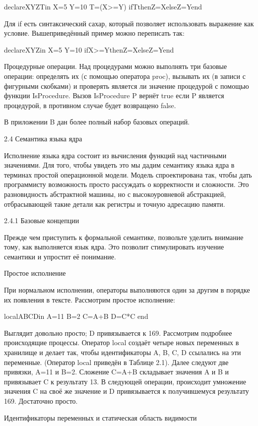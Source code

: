 declareXYZTin
X=5 Y=10
T=(X>=Y)
ifTthenZ=XelseZ=Yend

Для if есть синтаксический сахар, который позволяет использовать выражение как условие. Вышеприведённый пример можно переписать так:

declareXYZin
X=5 Y=10
ifX>=YthenZ=XelseZ=Yend

Процедурные операции. Над процедурами можно выполнять три базовые операции: определять их (с помощью оператора proc), вызывать их (в записи с фигурными скобками) и проверять является ли значение процедурой с помощью функции IsProcedure. Вызов {IsProcedure P} вернёт true если P является процедурой, в противном случае будет возвращено false.

В приложении B дан более полный набор базовых операций.

2.4 Семантика языка ядра

Исполнение языка ядра состоит из вычисления функций над частичными значениями. Для того, чтобы увидеть это мы дадим семантику языка ядра в терминах простой операционной модели. Модель спроектирована так, чтобы дать программисту возможность просто рассуждать о корректности и сложности. Это разновидность абстрактной машины, но с высокоуровневой абстракцией, отбрасывающей такие детали как регистры и точную адресацию памяти.

2.4.1 Базовые концепции

Прежде чем приступить к формальной семантике, позвольте уделить внимание тому, как выполняется язык ядра. Это позволит стимулировать изучение семантики и упростит её понимание.

Простое исполнение

При нормальном исполнении, операторы выполняются один за другим в порядке их появления в тексте. Рассмотрим простое исполнение:

localABCDin
A=11
B=2
C=A+B
D=C*C
end

Выглядит довольно просто; D привязывается к 169. Рассмотрим подробнее происходящие процессы. Оператор local создаёт четыре новых переменных в хранилище и делает так, чтобы идентификаторы A, B, C, D ссылались на эти переменные. (Оператор local приведён в Таблице 2.1). Далее следуют две привязки, A=11 и B=2. Сложение C=A+B складывает значения A и B и привязывает C к результату 13. В следующей операции, происходит умножение значения C на своё же значение и D привязывается к получившемуся результату 169. Достаточно просто.

Идентификаторы переменных и статическая область видимости

